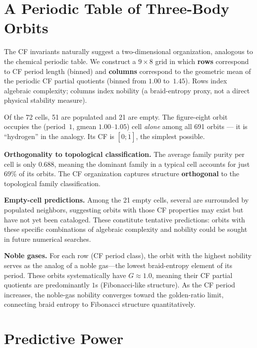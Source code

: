 \documentclass[11pt]{article}
\theoremstyle{definition}
\begin{document}
\section{A Periodic Table of Three-Body Orbits}\label{sec:periodic-table}

The CF invariants naturally suggest a two-dimensional organization,
analogous to the chemical periodic table. We construct a
$9 \times 8$ grid in which \textbf{rows} correspond to CF period
length (binned) and \textbf{columns} correspond to the geometric
mean of the periodic CF partial quotients (binned from $1.00$
to~$1.45$). Rows index algebraic complexity; columns index nobility
(a braid-entropy proxy, not a direct physical stability measure).

Of the 72 cells, 51 are populated and 21 are empty. The
figure-eight orbit occupies the (period~$1$, gmean $1.00$--$1.05$)
cell \emph{alone} among all 691 orbits --- it is ``hydrogen'' in
the analogy. Its CF is $[0; \overline{1}]$, the simplest possible.

\textbf{Orthogonality to topological classification.} The average
family purity per cell is only 0.688, meaning the dominant family
in a typical cell accounts for just 69\% of its orbits. The CF
organization captures structure \textbf{orthogonal} to the
topological family classification.

\textbf{Empty-cell predictions.} Among the 21 empty cells, several
are surrounded by populated neighbors, suggesting orbits with those
CF properties may exist but have not yet been cataloged.  These
constitute tentative predictions: orbits with these specific
combinations of algebraic complexity and nobility could be sought
in future numerical searches.

\textbf{Noble gases.}  For each row (CF period class), the orbit
with the highest nobility serves as the analog of a noble gas---the
lowest braid-entropy element of its period.  These orbits systematically have
$G \approx 1.0$, meaning their CF partial quotients are predominantly
$1$s (Fibonacci-like structure).  As the CF period increases, the
noble-gas nobility converges toward the golden-ratio limit, connecting
braid entropy to Fibonacci structure quantitatively.


\section{Predictive Power}\label{sec:prediction}
\end{document}
